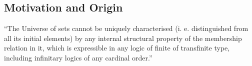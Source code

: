 \subsection{Motivation and Origin}
\begin{displayquote}
``The Universe of sets cannot be uniquely characterised (i. e. distinguished from all its initial elements) by any internal structural property of the membership relation in it, which is expressible in any logic of finite of transfinite type, including infinitary logics of any cardinal order.''
\end{displayquote}
\begin{comment}
To understand why need reflection in the first place, let's think about infinity for a moment. In the intuitive sense, infinity is an upper limit of all numbers. 
But for centuries, this was merely a philosophical concept of limitlessness. %
Probably the best-known classic problems involving infinity are the famous paradoxes of Zeno. %
In response to those, Aristotle introduced the distinction between an actual and a potential infinity\footnote{See Aristotle’s Physics, Book III}. %
By potential infinity we understand that concept of a process does in unbounded in a sense that it could continue for an arbitrary amount of time, but is also never complete. %
Actual infinity, is, on the other hand, the concept of infinity contained in a bounded space, just like the number of fractions between 0 and 1. Aristotle argued, that the potential infinity is (in today's words) well defined, as opposed to the actual infinity, which is a vague and incoherent concept. He didn't think it's possible for infinite amount of entities to inhabit a bounded place in space or time, rejecting Zeno's thought experiments as a whole. But it's not our aim to get into much detail.  %
The aspect of infinity that is relevant to our interests is the human inability to directly experience limitlessness in contrast to how easily can one talk about infinity and limitlessness in the natural language. 
The short trip into history hopefully served as an example of the fact that certain statements can easily be considered either meaningful or meaningless.  %
But while infinity of any kind can't be experienced directly through senses, much effort has been made by philosophers to find a way to meaningfully talk about infinite. 
To see how this leads to reflection, see what Aquinas wrote in his Summa Theologica \footnote{Part I, Question 7, Article 3, Reply to Objection 1}:

\end{comment}
